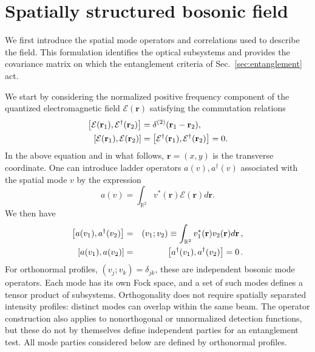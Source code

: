 \documentclass[%
 reprint,
 amsmath,amssymb,
 aps,
pra,
twocolumn,
]{revtex4-2}
\begin{document}
\section{Spatially structured bosonic field}
\label{sec:bosonfield}

We first introduce the spatial mode operators and correlations used to describe the field. This formulation identifies the optical subsystems and provides the covariance matrix on which the entanglement criteria of Sec.~\ref{sec:entanglement} act.

We start by considering the normalized positive frequency component of the quantized electromagnetic field
$\mathcal{E}(\mathbf{r})$ satisfying the commutation relations
%
\begin{equation}
    \label{eq:commutation_relations}
    \begin{aligned}
        \comm{\mathcal{E}(\mathbf{r}_1)}{\mathcal{E}^\dagger(\mathbf{r}_2)}
        &= \delta^{(2)}(\mathbf{r}_1 - \mathbf{r}_2), \\
        \comm{\mathcal{E}(\mathbf{r}_1)}{\mathcal{E}(\mathbf{r}_2)}
        &= \comm{\mathcal{E}^\dagger(\mathbf{r}_1)}{\mathcal{E}^\dagger(\mathbf{r}_2)} = 0.
    \end{aligned}
\end{equation}
%
In the above equation and in what follows, $\mathbf{r} = (x, y)$ is the transverse coordinate.
One can introduce ladder operators $a(v), a^\dagger(v)$ associated with the spatial mode $v$ by the expression
%
\begin{equation}
    a(v) = \int_{\mathbb{R}^2} v^*(\mathbf{r}) \mathcal{E}(\mathbf{r}) d\mathbf{r}.
\end{equation}
%
We then have
%
\begin{eqnarray}
    \comm{a(v_1)}{a^\dagger(v_2)} &=& (v_1;v_2) \equiv\int_{\mathbb{R}^2} v_1^*(\mathbf{r}) v_2(\mathbf{r}) d\mathbf{r}\,,
    \nonumber\\
    \comm{a(v_1)}{a(v_2)} &=& \comm{a^\dagger(v_1)}{a^\dagger(v_2)} = 0\,.
\end{eqnarray}
For orthonormal profiles, $(v_j;v_k)=\delta_{jk}$, these are independent bosonic mode operators. Each mode has its own Fock space, and a set of such modes defines a tensor product of subsystems. Orthogonality does not require spatially separated intensity profiles: distinct modes can overlap within the same beam. The operator construction also applies to nonorthogonal or unnormalized detection functions, but these do not by themselves define independent parties for an entanglement test. All mode parties considered below are defined by orthonormal profiles.
\end{document}
